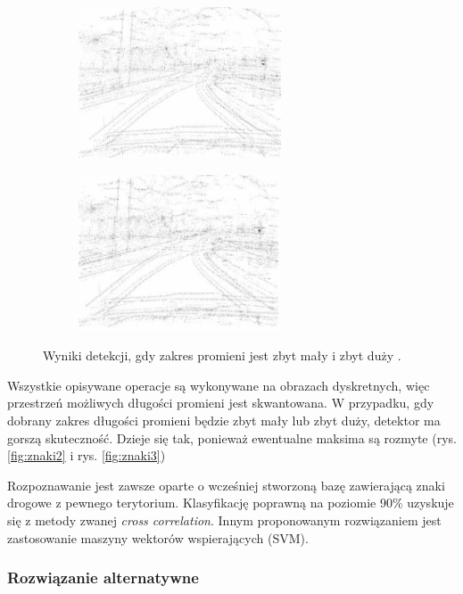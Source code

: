 \begin{figure}[h]
	\centering
	\begin{subfigure}{0.35\textwidth}
		\centering
		\includegraphics[width=6cm]{img/znaki2.png}
		\subcaption{\label{fig:znaki2}}
	\end{subfigure}
	\begin{subfigure}{0.35\textwidth}
		\centering
		\includegraphics[width=6cm]{img/znaki3.png}
		\subcaption{\label{fig:znaki3}}
	\end{subfigure}
	
	\caption{\label{fig:details}Wyniki detekcji, gdy zakres promieni jest zbyt mały \protect{} i zbyt duży \protect{}.\cite{T2}}
\end{figure}

Wszystkie opisywane operacje są wykonywane na obrazach dyskretnych, więc przestrzeń możliwych długości promieni jest skwantowana. 
W przypadku, gdy dobrany zakres długości promieni będzie zbyt mały lub zbyt duży, detektor ma gorszą skuteczność. 
Dzieje się tak, ponieważ ewentualne maksima są rozmyte (rys. \ref{fig:znaki2} i rys. \ref{fig:znaki3})

Rozpoznawanie jest zawsze oparte o wcześniej stworzoną bazę zawierającą znaki drogowe z pewnego terytorium. Klasyfikację poprawną na poziomie 90\% uzyskuje się z metody zwanej \textit{cross correlation}. Innym proponowanym rozwiązaniem jest zastosowanie maszyny wektorów wspierających (SVM).

\subsubsection{Rozwiązanie alternatywne}

